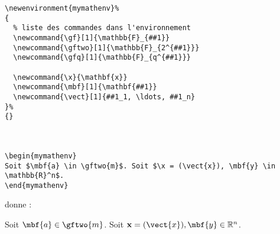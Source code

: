 \begin{verbatim}
\newenvironment{mymathenv}%
{
  % liste des commandes dans l'environnement
  \newcommand{\gf}[1]{\mathbb{F}_{##1}}
  \newcommand{\gftwo}[1]{\mathbb{F}_{2^{##1}}}
  \newcommand{\gfq}[1]{\mathbb{F}_{q^{##1}}}

  \newcommand{\x}{\mathbf{x}}
  \newcommand{\mbf}[1]{\mathbf{##1}}
  \newcommand{\vect}[1]{##1_1, \ldots, ##1_n}
}%
{}



\begin{mymathenv}
Soit $\mbf{a} \in \gftwo{m}$. Soit $\x = (\vect{x}), \mbf{y} \in \mathbb{R}^n$.
\end{mymathenv}
\end{verbatim}
donne :\\
\begin{mymathenv}
Soit $\mbf{a} \in \gftwo{m}$. Soit $\x = (\vect{x}), \mbf{y} \in \mathbb{R}^n$.
\end{mymathenv}
